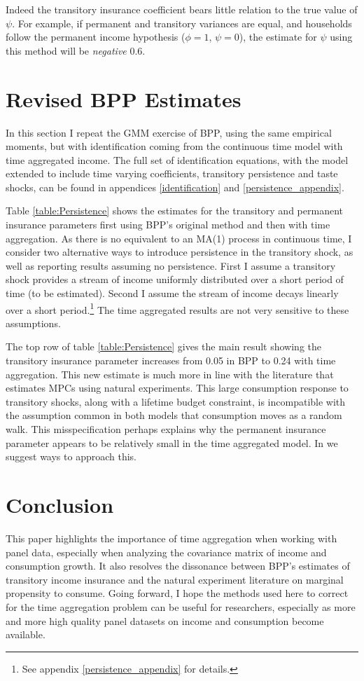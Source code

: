 \documentclass[AER]{AEA}
\begin{document}
Indeed the transitory insurance coefficient bears little relation to the true value of $\psi$. For example, if permanent and transitory variances are equal, and households follow the permanent income hypothesis ($\phi=1$, $\psi=0$), the estimate for $\psi$ using this method will be \textit{negative} 0.6.

\section{Revised BPP Estimates} \label{evidence}

In this section I repeat the GMM exercise of BPP, using the same empirical moments, but with identification coming from the continuous time model with time aggregated income. The full set of identification equations, with the model extended to include time varying coefficients, transitory persistence and taste shocks, can be found in appendices \ref{identification} and \ref{persistence_appendix}. 



Table \ref{table:Persistence} shows the estimates for the transitory and permanent insurance parameters first using BPP's original method and then with time aggregation. As there is no equivalent to an MA(1) process in continuous time, I consider two alternative ways to introduce persistence in the transitory shock, as well as reporting results assuming no persistence. First I assume a transitory shock provides a stream of income uniformly distributed over a short period of time (to be estimated). Second I assume the stream of income decays linearly over a short period.\footnote{See appendix \ref{persistence_appendix} for details.} The time aggregated results are not very sensitive to these assumptions.

The top row of table \ref{table:Persistence} gives the main result showing the transitory insurance parameter increases from 0.05 in BPP to 0.24 with time aggregation. This new estimate is much more in line with the literature that estimates MPCs using natural experiments. This large consumption response to transitory shocks, along with a lifetime budget constraint, is incompatible with the assumption common in both models that consumption moves as a random walk. This misspecification perhaps explains why the permanent insurance parameter appears to be relatively small in the time aggregated model. In \cite{crawley_consumption_2018} we suggest ways to approach this.

\section{Conclusion}
This paper highlights the importance of time aggregation when working with panel data, especially when analyzing the covariance matrix of income and consumption growth. It also resolves the dissonance between BPP's estimates of transitory income insurance and the natural experiment literature on marginal propensity to consume. Going forward, I hope the methods used here to correct for the time aggregation problem can be useful for researchers, especially as more and more high quality panel datasets on income and consumption become available.
\end{document}
